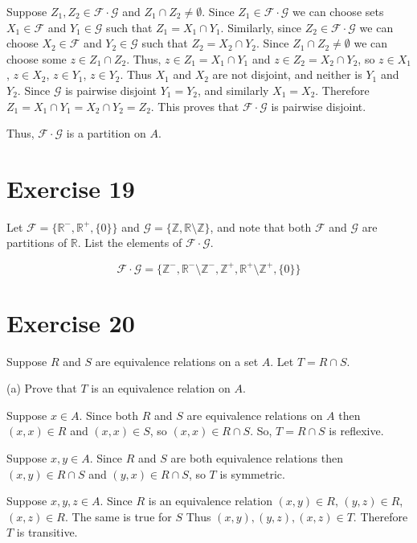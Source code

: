 \documentclass[11pt]{article}
\newcommand{\family}[1]{\mathcal{#1}}
\begin{document}
Suppose $Z_1, Z_2 \in \family{F} \cdot \family{G}$ and $Z_1 \cap Z_2 \neq \emptyset$.
Since $Z_1 \in \family{F} \cdot \family{G}$ we can choose sets $X_1 \in \family{F}$
and $Y_1 \in \family{G}$ such that $Z_1 = X_1 \cap Y_1$. Similarly, since 
$Z_2 \in \family{F} \cdot \family{G}$ we can choose $X_2 \in \family{F}$
and $Y_2 \in \family{G}$ such that $Z_2 = X_2 \cap Y_2$. Since 
$Z_1 \cap Z_2 \neq \emptyset$ we can choose some $z \in Z_1 \cap Z_2$. Thus, 
$z \in Z_1 = X_1 \cap Y_1$ and $z \in Z_2 = X_2 \cap Y_2$, so 
$z \in X_1$, $z \in X_2$, $z \in Y_1$, $z \in Y_2$. Thus $X_1$ and $X_2$ are 
not disjoint, and neither is $Y_1$ and $Y_2$. Since $\family{G}$ is pairwise 
disjoint $Y_1 = Y_2$, and similarly $X_1 = X_2$. Therefore 
$Z_1 = X_1 \cap Y_1 = X_2 \cap Y_2 = Z_2$. This proves that 
$\family{F} \cdot \family{G}$ is pairwise disjoint.

Thus, $\family{F} \cdot \family{G}$ is a partition on $A$.

\section*{Exercise 19}

Let $\family{F} = \{\mathbb{R}^-, \mathbb{R}^+, \{0\}\}$ and 
$\family{G} = \{\mathbb{Z}, \mathbb{R} \setminus \mathbb{Z}\}$, and note that 
both $\family{F}$ and $\family{G}$ are partitions of $\mathbb{R}$. List the 
elements of $\family{F} \cdot \family{G}$.

$$\family{F} \cdot \family{G} = \{\mathbb{Z}^-, \mathbb{R}^- \setminus \mathbb{Z}^-,
\mathbb{Z}^+, \mathbb{R}^+ \setminus \mathbb{Z}^+, \{0\}\}$$

\section*{Exercise 20}

Suppose $R$ and $S$ are equivalence relations on a set $A$. Let $T = R \cap S$.

\noindent (a) Prove that $T$ is an equivalence relation on $A$.

Suppose $x \in A$. Since both $R$ and $S$ are equivalence relations on $A$ then
$(x,x) \in R$ and $(x,x) \in S$, so $(x,x) \in R \cap S$. So, $T = R \cap S$ is 
reflexive.

Suppose $x,y \in A$. Since $R$ and $S$ are both equivalence relations then 
$(x,y) \in R \cap S$ and $(y,x) \in R \cap S$, so $T$ is symmetric.

Suppose $x,y,z \in A$. Since $R$ is an equivalence relation
$(x,y) \in R$, $(y,z) \in R$, $(x,z) \in R$. The same is true for $S$ Thus
$(x,y), (y,z), (x,z) \in T$. Therefore $T$ is transitive. 
\end{document}

